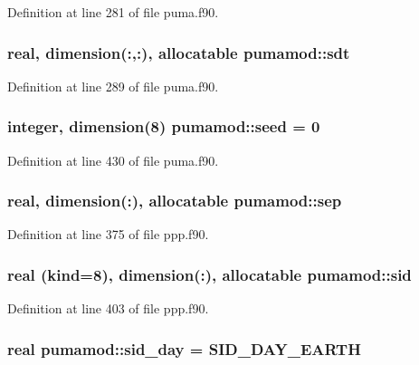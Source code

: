 \-Definition at line 281 of file puma.\-f90.

\hypertarget{classpumamod_a6469b0773780c7e85cc8fe80dab7360c}{
\subsubsection[{sdt}]{\setlength{\rightskip}{0pt plus 5cm}real, dimension(\-:,\-:), allocatable {\bf pumamod\-::sdt}}}
\label{classpumamod_a6469b0773780c7e85cc8fe80dab7360c}


\-Definition at line 289 of file puma.\-f90.

\hypertarget{classpumamod_a79c75848ef94fd2ff5e362ea59c98cbe}{
\subsubsection[{seed}]{\setlength{\rightskip}{0pt plus 5cm}integer, dimension(8) {\bf pumamod\-::seed} = 0}}
\label{classpumamod_a79c75848ef94fd2ff5e362ea59c98cbe}


\-Definition at line 430 of file puma.\-f90.

\hypertarget{classpumamod_a0a5b087ce0b768e344e2e0fd38dccd49}{
\subsubsection[{sep}]{\setlength{\rightskip}{0pt plus 5cm}real, dimension(\-:), allocatable {\bf pumamod\-::sep}}}
\label{classpumamod_a0a5b087ce0b768e344e2e0fd38dccd49}


\-Definition at line 375 of file ppp.\-f90.

\hypertarget{classpumamod_afaa36786d595931f29f0eb93f01ed83d}{
\subsubsection[{sid}]{\setlength{\rightskip}{0pt plus 5cm}real (kind=8), dimension(\-:), allocatable {\bf pumamod\-::sid}}}
\label{classpumamod_afaa36786d595931f29f0eb93f01ed83d}


\-Definition at line 403 of file ppp.\-f90.

\hypertarget{classpumamod_a9c5b63f9c6cf129e3aa566b6343beb6a}{
\subsubsection[{sid\-\_\-day}]{\setlength{\rightskip}{0pt plus 5cm}real {\bf pumamod\-::sid\-\_\-day} = \-S\-I\-D\-\_\-\-D\-A\-Y\-\_\-\-E\-A\-R\-T\-H}}
\label{classpumamod_a9c5b63f9c6cf129e3aa566b6343beb6a}


